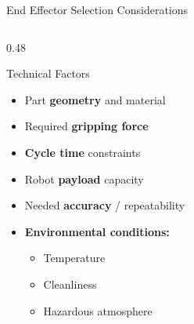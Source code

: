 \documentclass[10pt]{beamer}
\begin{document}
\begin{frame}{End Effector Selection Considerations}

\begin{columns}[t]

    \begin{column}{0.48\textwidth}
        \begin{block}{Technical Factors}
            \footnotesize
            \begin{itemize}
                \item Part \textbf{geometry} and material
                \item Required \textbf{gripping force}
                \item \textbf{Cycle time} constraints
                \item Robot \textbf{payload} capacity
                \item Needed \textbf{accuracy} / repeatability
                \item \textbf{Environmental conditions:}
                \begin{itemize}
                    \footnotesize
                    \item Temperature
                    \item Cleanliness
                    \item Hazardous atmosphere
                \end{itemize}
            \end{itemize}
        \end{block}
    \end{column}


\end{columns}
\end{frame}
\end{document}

